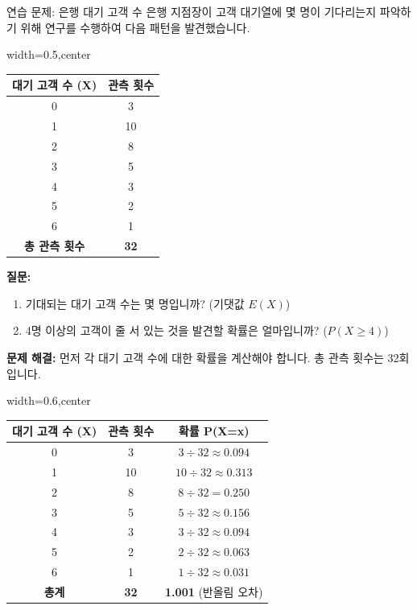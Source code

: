 \documentclass[11pt,a4paper]{article}
\begin{document}
\begin{examplebox}{연습 문제: 은행 대기 고객 수}
은행 지점장이 고객 대기열에 몇 명이 기다리는지 파악하기 위해 연구를 수행하여 다음 패턴을 발견했습니다.

\begin{adjustbox}{width=0.5\textwidth,center}
\begin{tabular}{cc}
\toprule
\textbf{대기 고객 수 (X)} & \textbf{관측 횟수} \\
\midrule
0 & 3 \\
1 & 10 \\
2 & 8 \\
3 & 5 \\
4 & 3 \\
5 & 2 \\
6 & 1 \\
\midrule
\textbf{총 관측 횟수} & \textbf{32} \\
\bottomrule
\end{tabular}
\end{adjustbox}

\textbf{질문:}
\begin{enumerate}
    \item 기대되는 대기 고객 수는 몇 명입니까? (기댓값 \(E(X)\))
    \item 4명 이상의 고객이 줄 서 있는 것을 발견할 확률은 얼마입니까? (\(P(X \ge 4)\))
\end{enumerate}

\textbf{문제 해결:}
먼저 각 대기 고객 수에 대한 확률을 계산해야 합니다. 총 관측 횟수는 32회입니다.

\begin{adjustbox}{width=0.6\textwidth,center}
\begin{tabular}{ccc}
\toprule
\textbf{대기 고객 수 (X)} & \textbf{관측 횟수} & \textbf{확률 P(X=x)} \\
\midrule
0 & 3 & \(3 \div 32 \approx 0.094\) \\
1 & 10 & \(10 \div 32 \approx 0.313\) \\
2 & 8 & \(8 \div 32 = 0.250\) \\
3 & 5 & \(5 \div 32 \approx 0.156\) \\
4 & 3 & \(3 \div 32 \approx 0.094\) \\
5 & 2 & \(2 \div 32 \approx 0.063\) \\
6 & 1 & \(1 \div 32 \approx 0.031\) \\
\midrule
\textbf{총계} & \textbf{32} & \textbf{1.001} (반올림 오차) \\
\bottomrule
\end{tabular}
\end{adjustbox}


\end{examplebox}
\end{document}
